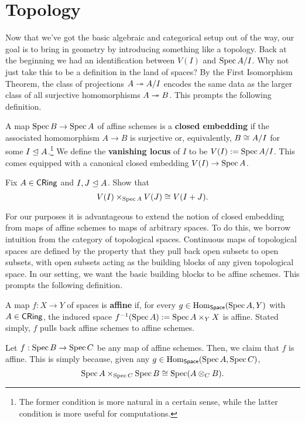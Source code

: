 \documentclass[11pt]{article}
\begin{document}
\section{Topology}
Now that we've got the basic algebraic and categorical setup out of the way, our goal is to bring in geometry by introducing something like a topology. Back at the beginning we had an identification between $V(I)$ and $\operatorname{Spec} A/I$. Why not just take this to be a definition in the land of spaces? By the First Isomorphism Theorem, the class of projections $A\twoheadrightarrow A/I$ encodes the same data as the larger class of all surjective homomorphisms $A\twoheadrightarrow B$. This prompts the following definition.

\begin{definition}
A map $\operatorname{Spec} B\to\operatorname{Spec} A$ of affine schemes is a \textbf{closed embedding} if the associated homomorphism $A\to B$ is surjective or, equivalently, $B\cong A/I$ for some $I\trianglelefteq A$.\footnote{The former condition is more natural in a certain sense, while the latter condition is more useful for computations.} We define the \textbf{vanishing locus} of $I$ to be $V(I):=\operatorname{Spec} A/I$. This comes equipped with a canonical closed embedding $V(I)\to\operatorname{Spec} A$.
\end{definition}

\begin{exercise}
Fix $A\in\operatorname{\mathsf{CRing}}$ and $I,J\trianglelefteq A$. Show that 
$$V(I)\times_{\operatorname{Spec} A}V(J)\cong V(I+J).$$
\end{exercise}

For our purposes it is advantageous to extend the notion of closed embedding from maps of affine schemes to maps of arbitrary spaces. To do this, we borrow intuition from the category of topological spaces. Continuous maps of topological spaces are defined by the property that they pull back open subsets to open subsets, with open subsets acting as the building blocks of any given topological space. In our setting, we want the basic building blocks to be affine schemes. This prompts the following definition.

\begin{definition}
A map $f: X\to Y$ of spaces is \textbf{affine} if, for every $g\in\operatorname{Hom}_{\operatorname{\mathsf{Space}}}(\operatorname{Spec} A,Y)$ with $A\in\operatorname{\mathsf{CRing}}$, the induced space $f^{-1}(\operatorname{Spec} A):=\operatorname{Spec} A\times_YX$ is affine. Stated simply, $f$ pulls back affine schemes to affine schemes.
\end{definition}

\begin{example}
Let $f: \operatorname{Spec} B\to\operatorname{Spec} C$ be any map of affine schemes. Then, we claim that $f$ is affine. This is simply because, given any $g\in\operatorname{Hom}_{\operatorname{\mathsf{Space}}}(\operatorname{Spec} A,\operatorname{Spec} C)$, 
$$\operatorname{Spec} A\times_{\operatorname{Spec} C}\operatorname{Spec} B\cong\operatorname{Spec}(A\otimes_CB).$$
\end{example}
\end{document}
